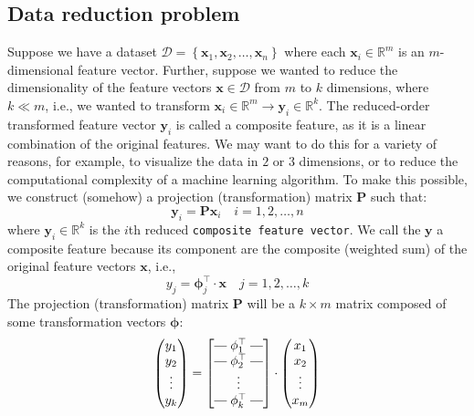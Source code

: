 \documentclass{article}[11pt]
\makeatletter
\newcommand{\brows}[1]{%
  \begin{bmatrix}
  \begin{array}{@{\protect\rotvert\;}c@{\;\protect\rotvert}}
  #1
  \end{array}
  \end{bmatrix}
}
\newcommand{\rotvert}{\rotatebox[origin=c]{90}{$\vert$}}
\newcommand{\rowsvdots}{\multicolumn{1}{@{}c@{}}{\vdots}}
\def\R{\mathbb{R}}
\def\D{\mathcal{D}}
\makeatother
\begin{document}
\subsection{Data reduction problem}
Suppose we have a dataset $\D = \left\{\mathbf{x}_{1},\mathbf{x}_{2},\dots,\mathbf{x}_{n}\right\}$ where each $\mathbf{x}_{i}\in\mathbb{R}^{m}$ is an $m$-dimensional feature vector.
Further, suppose we wanted to reduce the dimensionality of the feature vectors $\mathbf{x}\in\D$ from $m$ to $k$ dimensions, where $k\ll{m}$, 
i.e., we wanted to transform $\mathbf{x}_{i}\in\R^{m}\rightarrow\mathbf{y}_{i}\in\R^{k}$. 
The reduced-order transformed feature vector $\mathbf{y}_{i}$ is called a composite feature, as it is a linear combination of the original features.
We may want to do this for a variety of reasons, for example, to visualize the data in $2$ or $3$ dimensions, or to reduce the computational complexity of a machine learning algorithm.
To make this possible, we construct (somehow) a projection (transformation) matrix $\mathbf{P}$ such that:
\begin{equation}
   \mathbf{y}_{i} = \mathbf{P}\mathbf{x}_{i}\quad{i=1,2,\dots,n}
\end{equation}
where $\mathbf{y}_{i}\in\R^{k}$ is the $i$th reduced \texttt{composite feature vector}. 
We call the $\mathbf{y}$ a composite feature because its component are the composite (weighted sum) of the original feature vectors $\mathbf{x}$, i.e., 
\begin{equation}
y_{j} = {\mathbf{\phi}}_{j}^{\top}\cdot\mathbf{x}\quad{j=1,2,\dots,k}
\end{equation}
The projection (transformation) matrix $\mathbf{P}$ will be a $k\times{m}$ matrix composed of some transformation vectors $\mathbf{\phi}$:
\begin{equation}
   \begin{pmatrix}
      y_{1} \\
      y_{2} \\
      \vdots \\
      y_{k}
   \end{pmatrix} = \brows{{\mathbf{\phi}}_1^\top \\ {\mathbf{\phi}}_2^\top \\ \rowsvdots \\ {\mathbf{\phi}}_k^\top}
   \cdot
   \begin{pmatrix}
      x_{1} \\
      x_{2} \\
      \vdots \\
      x_{m}
   \end{pmatrix}
\end{equation}
\end{document}
